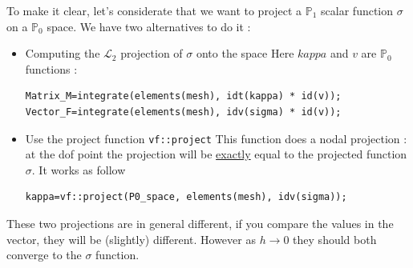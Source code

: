 To make it clear, let's considerate that we want to project a $\mathbb{P}_1$ scalar function $\sigma$ on a $\mathbb{P}_0$ space. We have two alternatives to do it :
\begin{itemize}
\item Computing the $\mathcal{L}_2$ projection of $\sigma$ onto the space \newline
Here $kappa$ and $v$ are $\mathbb{P}_0$ functions :
\begin{lstlisting}
Matrix_M=integrate(elements(mesh), idt(kappa) * id(v));
Vector_F=integrate(elements(mesh), idv(sigma) * id(v));
\end{lstlisting}

\item Use the project function \lstinline!vf::project! \newline
This function does a nodal projection : at the dof point the projection will be \underline{exactly} equal to the projected function $\sigma$. It works as follow 
\begin{lstlisting}
kappa=vf::project(P0_space, elements(mesh), idv(sigma));
\end{lstlisting}
\end{itemize}

These two projections are in general different, if you compare the values in the vector, they will be (slightly) different. However as $h \rightarrow 0$ they should both converge to the $\sigma$ function.


